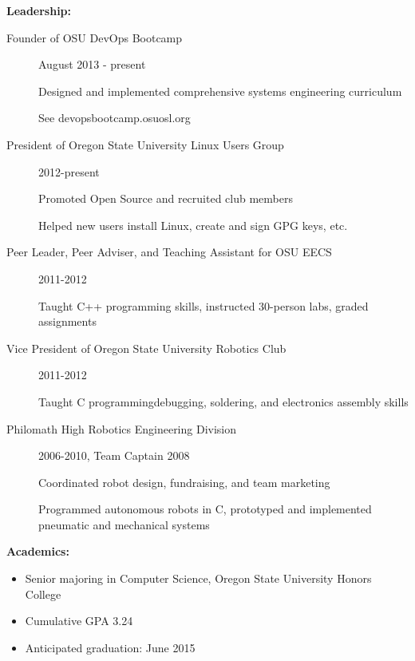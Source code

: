 \documentclass[11pt]{article}
\begin{document}
{\Large \bf Leadership:}
\begin{description}
    \item[Founder of OSU DevOps Bootcamp]
        \hfill August 2013 - present
        
        Designed and implemented comprehensive systems engineering curriculum

        See devopsbootcamp.osuosl.org

    \item[President of Oregon State University Linux Users Group]
        \hfill 2012-present

        Promoted Open Source and recruited club members

        Helped new users install Linux, create and sign GPG keys, etc.

    \item[Peer Leader, Peer Adviser, and Teaching Assistant for OSU EECS]
        \hfill 2011-2012

        Taught C++ programming skills, instructed 30-person labs, graded
        assignments

    \item[Vice President of Oregon State University Robotics Club]
        \hfill 2011-2012

        Taught C programming\/debugging, soldering, and electronics assembly skills

    \item[Philomath High Robotics Engineering Division]
        \hfill 2006-2010, Team Captain 2008

        Coordinated robot design, fundraising, and team marketing

        Programmed autonomous robots in C, prototyped and implemented
        pneumatic and mechanical systems

\end{description}

\smallskip
\hrulefill
\bigskip

{\Large \bf Academics:}
\begin{itemize}
    \setlength{\itemsep}{1pt}
    \setlength{\parskip}{0pt}
    \setlength{\parsep}{0pt}

    \item Senior majoring in Computer Science, Oregon State University
          Honors College
    \item Cumulative GPA 3.24
    \item Anticipated graduation: June 2015

\end{itemize}
\end{document}
